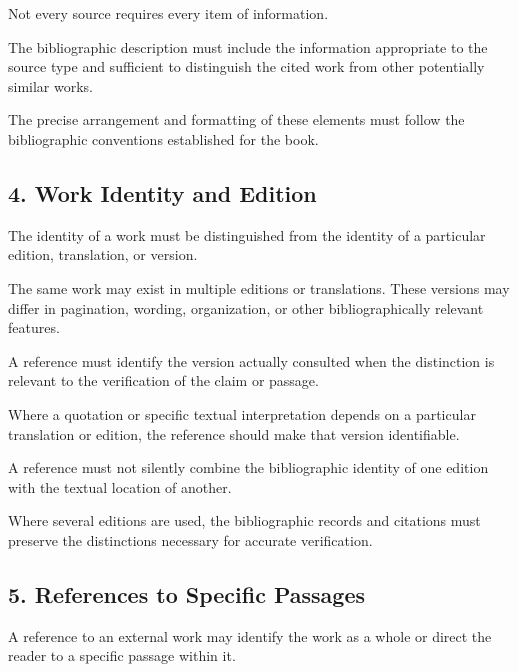 Not every source requires every
item of information.

The bibliographic description
must include the information
appropriate to the source type
and sufficient to distinguish
the cited work from other
potentially similar works.

The precise arrangement and
formatting of these elements
must follow the bibliographic
conventions established for
the book.


\subsection*{4. Work Identity and Edition}

The identity of a work must
be distinguished from the
identity of a particular
edition, translation, or version.

The same work may exist in
multiple editions or translations.
These versions may differ in
pagination, wording, organization,
or other bibliographically
relevant features.

A reference must identify
the version actually consulted
when the distinction is relevant
to the verification of the
claim or passage.

Where a quotation or specific
textual interpretation depends
on a particular translation
or edition, the reference
should make that version
identifiable.

A reference must not silently
combine the bibliographic
identity of one edition with
the textual location of another.

Where several editions are
used, the bibliographic
records and citations must
preserve the distinctions
necessary for accurate
verification.


\subsection*{5. References to Specific Passages}

A reference to an external work
may identify the work as a whole
or direct the reader to a
specific passage within it.

